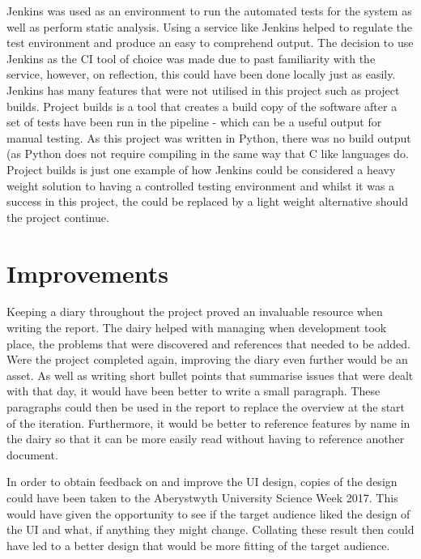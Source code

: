 Jenkins was used as an environment to run the automated tests for the system as well as perform static analysis. Using a service like Jenkins helped to regulate the test environment and produce an easy to comprehend output. The decision to use Jenkins as the CI tool of choice was made due to past familiarity with the service, however, on reflection, this could have been done locally just as easily. Jenkins has many features that were not utilised in this project such as project builds. Project builds is a tool that creates a build copy of the software after a set of tests have been run in the pipeline - which can be a useful output for manual testing. As this project was written in Python, there was no build output (as Python does not require compiling in the same way that C like languages do. Project builds is just one example of how Jenkins could be considered a heavy weight solution to having a controlled testing environment and whilst it was a success in this project, the could be replaced by a light weight alternative should the project continue.

\section{Improvements}
Keeping a diary throughout the project proved an invaluable resource when writing the report. The dairy helped with managing when development took place, the problems that were discovered and references that needed to be added. Were the project completed again, improving the diary even further would be an asset. As well as writing short bullet points that summarise issues that were dealt with that day, it would have been better to write a small paragraph. These paragraphs could then be used in the report to replace the overview at the start of the iteration. Furthermore, it would be better to reference features by name in the dairy so that it can be more easily read without having to reference another document.

In order to obtain feedback on and improve the UI design, copies of the design could have been taken to the Aberystwyth University Science Week 2017. This would have given the opportunity to see if the target audience liked the design of the UI and what, if anything they might change. Collating these result then could have led to a better design that would be more fitting of the target audience.


